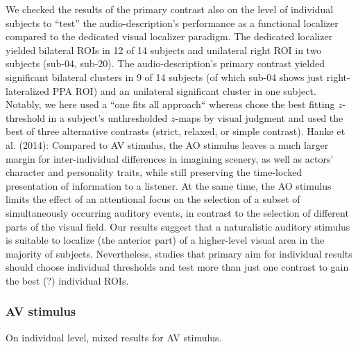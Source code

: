 \documentclass[english]{article}
\begin{document}



We checked the results of the primary contrast also on the level of individual
subjects to ``test'' the audio-description's performance as a functional
localizer compared to the dedicated visual localizer paradigm.
The dedicated localizer \citep{sengupta2016extension} yielded bilateral ROIs in
12 of 14 subjects and unilateral right ROI in two subjects (sub-04, sub-20).
The audio-description's primary contrast yielded significant bilateral clusters
in 9 of 14 subjects (of which sub-04 shows just right-lateralized PPA ROI)  and
an unilateral significant cluster in one subject.
Notably, we here used a ``one fits all approach`` whereas
\citep{sengupta2016extension} chose the best fitting $z$-threshold in a
subject's unthresholded $z$-maps by visual judgment and used the best of three
alternative contrasts (strict, relaxed, or simple contrast).
Hanke et al. (2014): Compared to AV stimulus, the AO stimulus leaves a much
larger margin for inter-individual differences in imagining scenery, as well as
actors' character and personality traits, while still preserving the time-locked
presentation of information to a listener. At the same time, the AO stimulus
limits the effect of an attentional focus on the selection of a subset of
simultaneously occurring auditory events, in contrast to the selection of
different parts of the visual field.
Our results suggest that a naturalistic auditory stimulus is suitable to
localize (the anterior part) of a higher-level visual area in the majority of
subjects.
Nevertheless, studies that primary aim for individual results should
choose individual thresholds and test more than just one contrast to gain the
best (?) individual ROIs.


\subsubsection{AV stimulus}
On individual level, mixed results for AV stimulus.
\end{document}
